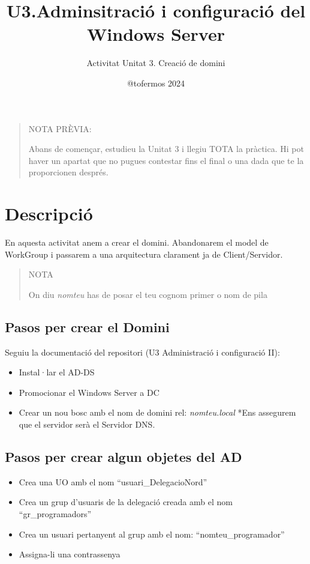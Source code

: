 \documentclass[
  a4paper,
]{article}
\title{U3.Adminsitració i configuració del Windows Server}
\subtitle{Activitat Unitat 3. Creació de domini}
\author{@tofermos 2024}
\date{}
\providecommand{\tightlist}{%
  \setlength{\itemsep}{0pt}\setlength{\parskip}{0pt}}
\begin{document}
\maketitle

{
\setcounter{tocdepth}{2}
\tableofcontents
}
\newpage
\renewcommand\tablename{Tabla}

\begin{quote}
NOTA PRÈVIA:

Abans de començar, estudieu la Unitat 3 i llegiu TOTA la pràctica. Hi
pot haver un apartat que no pugues contestar fins el final o una dada
que te la proporcionen després.
\end{quote}

\section{Descripció}\label{descripciuxf3}

En aquesta activitat anem a crear el domini. Abandonarem el model de
WorkGroup i passarem a una arquitectura clarament ja de Client/Servidor.

\begin{quote}
NOTA

On diu \emph{nomteu} has de posar el teu cognom primer o nom de pila
\end{quote}

\subsection{Pasos per crear el Domini}\label{pasos-per-crear-el-domini}

Seguiu la documentació del repositori (U3 Administració i configuració
II):

\begin{itemize}
\tightlist
\item
  Instal·lar el AD-DS
\item
  Promocionar el Windows Server a DC
\item
  Crear un nou bosc amb el nom de domini rel: \emph{nomteu.local} *Ens
  assegurem que el servidor serà el Servidor DNS.
\end{itemize}

\subsection{Pasos per crear algun objetes del
AD}\label{pasos-per-crear-algun-objetes-del-ad}

\begin{itemize}
\tightlist
\item
  Crea una UO amb el nom ``usuari\_DelegacioNord''
\item
  Crea un grup d'usuaris de la delegació creada amb el nom
  ``gr\_programadors''
\item
  Crea un usuari pertanyent al grup amb el nom: ``nomteu\_programador''
\item
  Assigna-li una contrassenya
\end{itemize}
\end{document}
